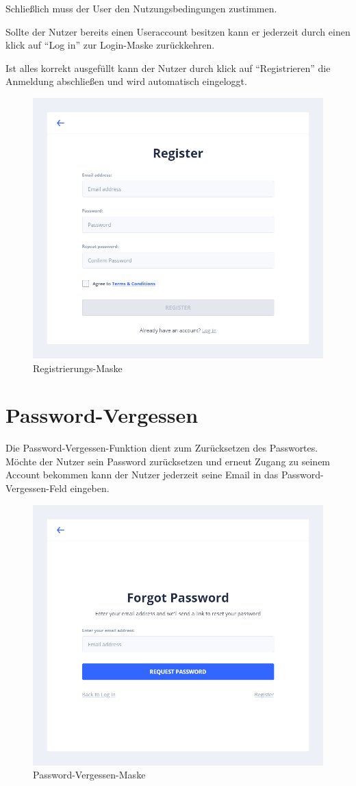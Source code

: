 Schließlich muss der User den Nutzungsbedingungen zustimmen.

Sollte der Nutzer bereits einen Useraccount besitzen kann er jederzeit durch einen klick auf \enquote{Log in} zur Login-Maske zurückkehren.

Ist alles korrekt ausgefüllt kann der Nutzer durch klick auf \enquote{Registrieren} die Anmeldung abschließen und wird automatisch eingeloggt.

\begin{figure}[h]
    \centering
    \includegraphics[width=.7\textwidth]{img/register.png}
    \caption{Registrierungs-Maske}
    \label{fig:registrierung}
\end{figure}


\section{Password-Vergessen}\label{sec:passwordVergessen}
Die Password-Vergessen-Funktion dient zum Zurücksetzen des Passwortes.
Möchte der Nutzer sein Password zurücksetzen und erneut Zugang zu seinem Account bekommen kann der Nutzer jederzeit seine Email in das Password-Vergessen-Feld eingeben.

\begin{figure}[h]
    \centering
    \includegraphics[width=.7\textwidth]{img/passwordReset.png}
    \caption{Password-Vergessen-Maske}
    \label{fig:passwordVergessen}
\end{figure}

